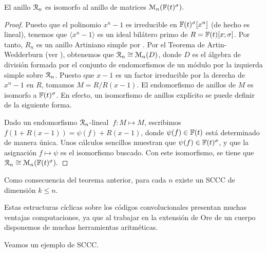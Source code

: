 \begin{teorema} \label{th:1}
El anillo $\mathcal R_n$ es isomorfo al anillo de matrices $\mathcal{M}_n(\mathbb{F}(t)^{\sigma}).$
\end{teorema}

\begin{proof}
    Puesto que el polinomio $x^n - 1$ es irreducible en $\mathbb{F}(t)^{\sigma}[x^n]$ (de hecho es lineal), tenemos que $\langle x^n - 1 \rangle$ es un ideal bilátero primo de $R = \mathbb{F}(t)[x;\sigma]$. Por tanto, $R_n$ es un anillo Artiniano simple por \cite[Th. 13, p. 40]{jacobson1943theory}. Por el Teorema de Artin-Wedderburn (ver \cite[Th 1.1]{artin}), obtenemos que $\mathcal R_n \cong \mathcal{M}_n(D)$, donde $D$ es el álgebra de división formada por el conjunto de endomorfismos de un módulo por la izquierda simple sobre $\mathcal R_n$. Puesto que $x - 1$ es un factor irreducible por la derecha de $x^n -1$ en $R$, tomamos $M = R/R(x-1)$. El endomorfismo de anillos de $M$ es isomorfo a $\mathbb{F}(t)^{\sigma}$. En efecto, un isomorfismo de anillos explícito se puede definir de la siguiente forma. 

    Dado un endomorfismo $\mathcal R_n$-lineal $\ f : M \mapsto M$, escribimos $f(1 + R(x-1)) = \psi(f) + R(x-1)$, donde $\psi(f) \in \mathbb{F}(t)$ está determinado de manera única. Unos cálculos sencillos muestran que $\psi(f) \in \mathbb{F}(t)^{\sigma}$, y que la asignación $ f \mapsto \psi$ es el isomorfismo buscado. Con este isomorfismo, se tiene que $\mathcal R_n \cong \mathcal{M}_n(\mathbb{F}(t)^\sigma).$
\end{proof}

Como consecuencia del teorema anterior, para cada $n$ existe un SCCC de dimensión $k \leq n$.

Estas estructuras cíclicas sobre los códigos convolucionales presentan muchas ventajas computaciones, ya que al trabajar en la extensión de Ore de un cuerpo disponemos de muchas herramientas aritméticas.

Veamos un ejemplo de SCCC.

